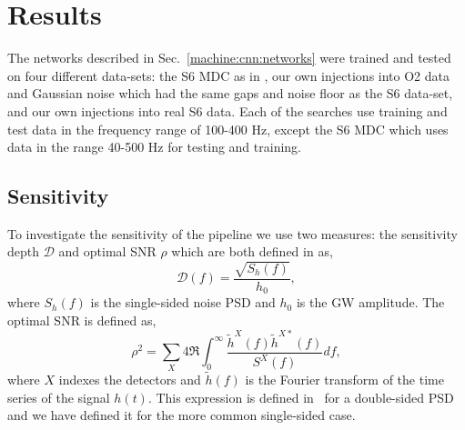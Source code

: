 \section{\label{machine:results}Results}

The networks described in Sec.~\ref{machine:cnn:networks} were trained and tested on four different data-sets: the S6 \ac{MDC} as in \cite{bayley2019SOAPGeneralised,walsh2016ComparisonMethods}, our own injections into O2 data and Gaussian noise which had the same gaps and noise floor as the S6 data-set, and our own injections into real S6 data. 
Each of the searches use training and test data in the frequency range of 100-400 Hz, except the S6 \ac{MDC} which uses data in the range 40-500 Hz for testing and training. 


\subsection{\label{machine:results:sensitivity} Sensitivity}

To investigate the sensitivity of the pipeline we use two measures: the sensitivity depth $\mathcal{D}$ \cite{prix2007SearchContinuous} and optimal \ac{SNR} $\rho$ \cite{behnke2015PostprocessingMethods} which are both defined in \cite{bayley2019SOAPGeneralised} as,
%
\begin{equation}
\label{sigmoid}
\mathcal{D}(f) = \frac{\sqrt{S_h(f)}}{h_0},
\end{equation}
%
where $S_h(f)$ is the single-sided noise \ac{PSD} and $h_0$ is the \ac{GW} amplitude. The optimal \ac{SNR} is defined as,
%
\begin{equation}
\rho^2 = \sum_X 4
\Re\int^{\infty}_{0}\frac{\tilde{h}^X(f)\tilde{h}^{X*}(f)}{S^X(f)}df,
\end{equation}
%
where $X$ indexes the detectors and $\tilde{h}(f)$ is the Fourier transform of the time series of the signal $h(t)$. 
This expression is defined in~\cite{prix2007SearchContinuous} for a double-sided \ac{PSD} and we have defined it for the more common single-sided case.


